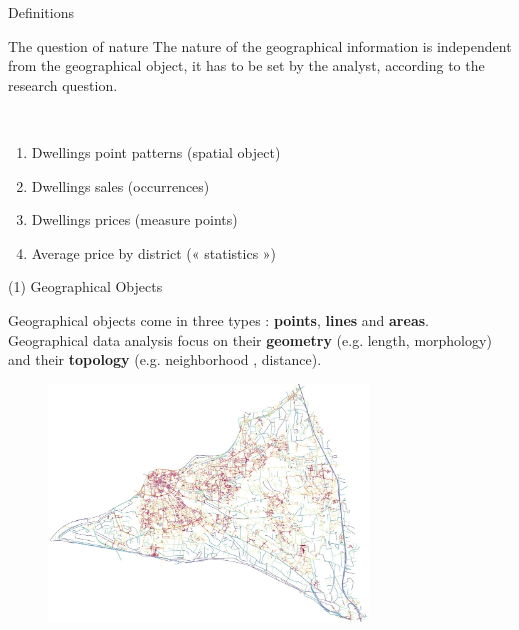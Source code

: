 \begin{frame}{Definitions}

\begin{block}{The question of nature}
The nature of the geographical information is independent from the geographical object, 
 it has to be set by the analyst, according to the research question.
\end{block}

~

\begin{enumerate}
\item Dwellings point patterns (spatial object)
\item Dwellings sales (occurrences)
\item Dwellings prices (measure points)
\item Average price by district (« statistics »)
\end{enumerate}

\end{frame}



\begin{frame}{(1) Geographical Objects }

 Geographical objects come in three types : \textbf{points}, \textbf{lines} and \textbf{areas}. Geographical data analysis focus on their \textbf{geometry} (e.g. length, morphology) and their \textbf{topology} (e.g. neighborhood , distance).

\begin{figure}
  \includegraphics[width=8.5cm]{Morpheo.jpg}
\end{figure}

\end{frame}


